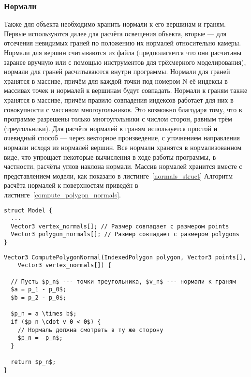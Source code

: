 \documentclass[a4paper,12pt]{report}
\numberwithin{equation}{section}
\begin{document}

\subsubsection{Нормали}
Также для объекта необходимо хранить нормали к его вершинам и граням. Первые используются далее для расчёта освещения объекта, вторые --- для отсечения невидимых граней по положению их нормалей относительно камеры. Нормали для вершин считываются из файла (предполагается что они расчитаны заранее вручную или с помощью инструментов для трёхмерного моделирования), нормали для граней расчитываются внутри программы. Нормали для граней хранятся в массиве, причём для каждой точки под номером N её индексы в массивах точек и нормалей к вершинам будут совпадать. Нормали к граням также хранятся в массиве, причём правило совпадения индексов работает для них в совокупности с массивом многоугольников. Это возможно благодаря тому, что в программе разрешены только многоугольники с числом сторон, равным трём (треугольники). Для расчёта нормалей к граням используется простой и очевидный способ --- через векторное произведение, с уточнением направления нормали исходя из нормалей вершин. Все нормали хранятся в нормализованном виде, что упрощает некоторые вычисления в ходе работы программы, в частности, расчёты углов наклона нормали. Массив нормалей хранится вместе с представлением модели, как показано в листинге~\ref{normals_struct} Алгоритм расчёта нормалей к поверхностям приведён в листинге~\ref{compute_polygon_normals}.

\begin{lstlisting}[float=h,caption={Структура данных ``Модель'' с добавленными полями нормалей},label=normals_struct]
struct Model {
  ...
  Vector3 vertex_normals[]; // Размер совпадает с размером points
  Vector3 polygon_normals[]; // Размер совпадает с размером polygons
}
\end{lstlisting}

\begin{lstlisting}[float=h,caption={Расчёт нормали к поверхности},label=compute_polygon_normals]
Vector3 ComputePolygonNormal(IndexedPolygon polygon, Vector3 points[],
    Vector3 vertex_normals[]) {
  
  // Пусть $p_n$ --- точки треугольника, $v_n$ --- нормали к граням
  $a = p_1 - p_0$;
  $b = p_2 - p_0$;
  
  $p_n = a \times b$;
  if ($p_n \cdot v_0 < 0$) {
    // Нормаль должна смотреть в ту же сторону
    $p_n = -p_n$;
  }
  
  return $p_n$;
}
\end{lstlisting}
\end{document}
